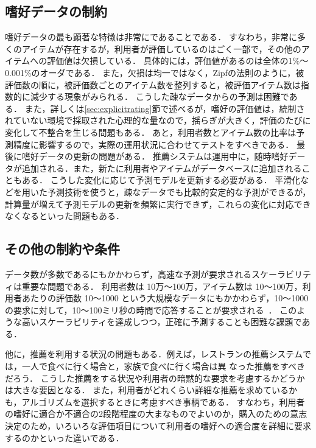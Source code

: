 \subsection{嗜好データの制約}

嗜好データの最も顕著な特徴は非常にであることである．
すなわち，非常に多くのアイテムが存在するが，利用者が評価しているのはごく一部で，その他のアイテムへの評価値は欠損している．
具体的には，評価値があるのは全体の1\%〜0.001\%のオーダである\cite{dmkd:01:01}．
また，欠損は均一ではなく，Zipfの法則\cite{jb:012:00}のように，被評価数の順に，被評価数ごとのアイテム数を整列すると，被評価アイテム数は指数的に減少する現象がみられる\cite{misc:007}．
こうした疎なデータからの予測は困難である．
また，詳しくは\ref{sec:explicitrating}節で述べるが，嗜好の評価値は，統制されていない環境で採取された心理的な量なので，揺らぎが大きく，評価のたびに変化して不整合を生じる問題もある．
あと，利用者数とアイテム数の比率は予測精度に影響する\cite{jacm:04:01}ので，実際の運用状況に合わせてテストをすべきである．
最後に嗜好データの更新の問題がある．
推薦システムは運用中に，随時嗜好データが追加される．また，新たに利用者やアイテムがデータベースに追加されることもある．
こうした変化に応じて予測モデルを更新する必要がある．
平滑化などを用いた予測技術を使うと，疎なデータでも比較的安定的な予測ができるが，計算量が増えて予測モデルの更新を頻繁に実行できず，これらの変化に対応できなくなるといった問題もある．

\subsection{その他の制約や条件}

データ数が多数であるにもかかわらず，高速な予測が要求されるスケーラビリティは重要な問題である．
利用者数は 10万〜100万，アイテム数は 10〜100万，利用者あたりの評価数 10〜1000 という大規模なデータにもかかわらず，10〜1000の要求に対して，10〜100ミリ秒の時間で応答することが要求される~\cite{dmkd:01:01,ieeem:03:01}．
このような高いスケーラビリティを達成しつつ，正確に予測することも困難な課題である．

他に，推薦を利用する状況の問題もある．例えば，レストランの推薦システムでは，一人で食べに行く場合と，家族で食べに行く場合は異
なった推薦をすべきだろう．
こうした推薦をする状況や利用者の暗黙的な要求を考慮するかどうかは大きな要因となる．
また，利用者がどれくらい詳細な推薦を求めているかも，アルゴリズムを選択するときに考慮すべき事柄である．
すなわち，利用者の嗜好に適合か不適合の2段階程度の大まなものでよいのか，購入のための意志決定のため，いろいろな評価項目について利用者の嗜好への適合度を詳細に要求するのかといった違いである．
